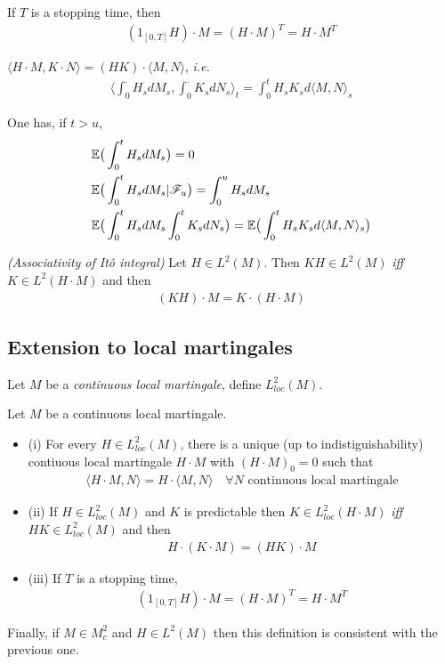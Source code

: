 \documentclass[10pt,a4paper]{article}
\renewenvironment{i}
{\begin{itemize} 
	}%
	{\end{itemize}
}
\begin{document}
\corr If $T$ is a stopping time, then
\begin{align*}
(1_{[0, T]}H) \cdot M = (H \cdot M)^T = H\cdot M^T
\end{align*}
\s

\corr $\langle H\cdot M, K\cdot N \rangle = (HK)\cdot \langle M, N \rangle$, \textit{i.e.}
\begin{align*}
\langle \int_0^{\cdot} H_s dM_s , \int_0^{\cdot} K_s dN_s \rangle_t = \int_0^t H_s K_s d\langle M, N \rangle_s 
\end{align*}
\s

\corr One has, if $t>u$,
\begin{align*}
& \mathbb{E} \big( \int_0^t H_s dM_s \big) =0 \\
& \mathbb{E} \big( \int_0^t H_s dM_s | \mathscr{F}_u \big) = \int_0^u H_s dM_s \\
& \mathbb{E} \big( \int_0^t H_s dM_s \int_0^t K_s dN_s \big) = \mathbb{E} \big( \int_0^t H_s K_s d\langle M, N \rangle_s \big)
\end{align*} 
\s

\corr \emph{(Associativity of It\^o integral)} Let $H\in L^2(M)$. Then $KH \in L^2(M)$ \emph{iff} $K \in L^2(H \cdot M)$ and then
\begin{align*}
(KH)\cdot M = K\cdot (H \cdot M)
\end{align*}

\subsection{Extension to local martingales}

 Let $M$ be a \emph{continuous local martingale}, define $L^2_{loc}(M)$.
\s

\thm Let $M$ be a continuous local martingale.
\begin{i}
\item[(i)] For every $H \in L^2_{loc}(M)$, there is a unique (up to indistiguishability) contiuous local martingale $H\cdot M$ with $(H\cdot M)_0 =0$ such that
\begin{align*}
\langle H \cdot M, N \rangle = H \cdot \langle M, N\rangle \quad \forall N \text{ continuous local martingale}
\end{align*}
\item[(ii)] If $H\in L_{loc}^2(M)$ and $K$ is predictable then $K\in L^2_{loc}(H \cdot M)$ \emph{iff} $HK\in L^2_{loc}(M)$ and then
\begin{align*}
H \cdot (K \cdot M) = (HK) \cdot M
\end{align*}
\item[(iii)] If $T$ is a stopping time,
\begin{align*}
(1_{[0, T]} H)\cdot M = (H \cdot M)^T = H\cdot M^T
\end{align*}
\end{i}
Finally, if $M\in M^2_c$ and $H\in L^2(M)$ then this definition is consistent with the previous one. 
\end{document}
